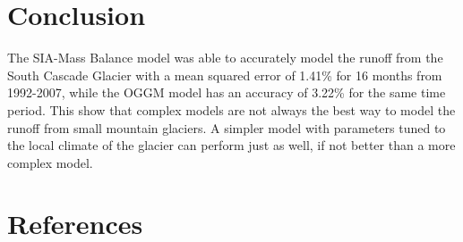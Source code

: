 \documentclass{article}
\begin{document}
\section{Conclusion}
The SIA-Mass Balance model was able to accurately model the runoff from the South Cascade Glacier with a mean squared error of 1.41\% for 16 
months from 1992-2007, while the OGGM model has an accuracy of 3.22\% for the same time period. This show that complex models are not always 
the best way to model the runoff from small mountain glaciers. A simpler model with parameters tuned to the local climate of the glacier can 
perform just as well, if not better than a more complex model. 

\section{References}
\end{document}
